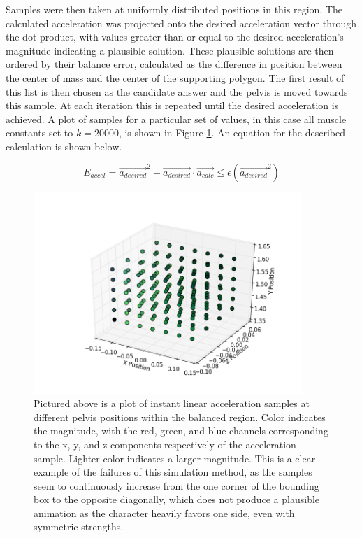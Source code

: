 Samples were then taken at uniformly distributed positions in this region.  The calculated acceleration was projected onto the desired acceleration vector through the dot product, with values greater than or equal to the desired acceleration's magnitude indicating a plausible solution.  These plausible solutions are then ordered by their balance error, calculated as the difference in position between the center of mass and the center of the supporting polygon.  The first result of this list is then chosen as the candidate answer and the pelvis is moved towards this sample.  At each iteration this is repeated until the desired acceleration is achieved.  A plot of samples for a particular set of values, in this case all muscle constants set to $k=20000$, is shown in Figure \ref{fig:torque_samples}.  An equation for the described calculation is shown below.

\[
	E_{accel} = \vec{a_{desired}}^2 - \vec{a_{desired}} \cdot \vec{a_{calc}} \le \epsilon \left(\vec{a_{desired}}^2\right)
\]

\begin{figure}[ht]
	\centering
	\includegraphics[width=4in]{images/K200000_global_dense_torque.png}
	\caption[A plot of a sample field for the torque based simulation]{Pictured above is a plot of instant linear acceleration samples at different pelvis positions within the balanced region.  Color indicates the magnitude, with the red, green, and blue channels corresponding to the x, y, and z components respectively of the acceleration sample.  Lighter color indicates a larger magnitude.  This is a clear example of the failures of this simulation method, as the samples seem to continuously increase from the one corner of the bounding box to the opposite diagonally, which does not produce a plausible animation as the character heavily favors one side, even with symmetric strengths.}
	\label{fig:torque_samples}
\end{figure}

